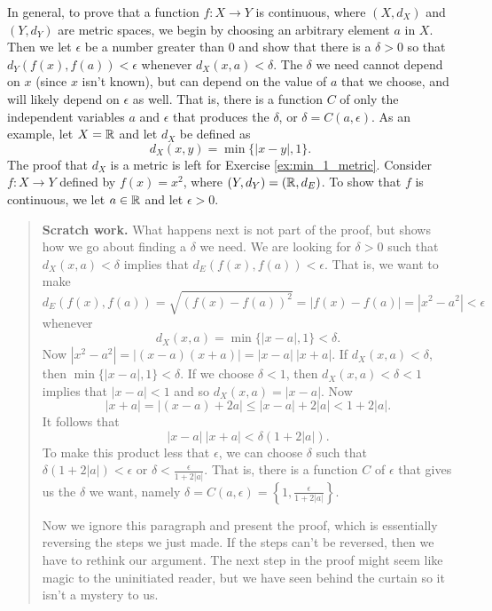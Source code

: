 \begin{example} In general, to prove that a function $f:X \to Y$ is continuous, where $(X,d_X)$ and $(Y, d_Y)$ are metric spaces, we begin by choosing an arbitrary element $a$ in $X$. Then we let $\epsilon$ be a number greater than $0$ and show that there is a $\delta > 0$ so that $d_Y(f(x),f(a)) < \epsilon$ whenever $d_X(x,a) < \delta$. The $\delta$ we need cannot depend on $x$ (since $x$ isn't known), but can depend on the value of $a$ that we choose, and will likely depend on $\epsilon$ as well. That is, there is a function $C$ of only the independent variables $a$ and $\epsilon$ that produces the $\delta$, or $\delta = C(a,\epsilon)$. As an example, let $X = \mathbb{R}$ and let $d_X$ be defined as 
\[d_X(x,y) = \min\{|x-y|,1\}.\]
The proof that $d_X$ is a metric is left for Exercise \ref{ex:min_1_metric}. Consider $f : X \to Y$ defined by $f(x) = x^2$, where $(Y,d_Y) = (\mathbb{R}, d_E)$. To show that $f$ is continuous, we let $a \in \mathbb{R}$ and let $\epsilon > 0$. 

\begin{quote} \textbf{Scratch work.} What happens next is not part of the proof, but shows how we go about finding a $\delta$ we need. We are looking for $\delta > 0$ such that $d_X(x,a) < \delta$ implies that $d_E(f(x),f(a)) < \epsilon$. That is, we want to make 
\[d_E(f(x),f(a)) = \sqrt{(f(x)-f(a))^2} = |f(x)-f(a)| = |x^2-a^2| < \epsilon\]
whenever
\[d_X(x,a) = \min\{|x-a|, 1\} < \delta.\]
Now $|x^2-a^2| = |(x-a)(x+a)| = |x-a| \ |x+a|$. If $d_X(x,a) < \delta$, then $\min\{|x-a|, 1\} < \delta$. If we choose $\delta < 1$, then $d_X(x,a) < \delta < 1$ implies that $|x-a| < 1$ and so $d_X(x,a) = |x-a|$. Now
\[|x+a| = |(x-a) + 2a| \leq |x-a| + 2|a| < 1+2|a|.\]
It follows that 
\[|x-a| \ |x+a| < \delta(1+2|a|).\]
To make this product less that $\epsilon$, we can choose $\delta$ such that $\delta(1+2|a|) < \epsilon$ or $\delta < \frac{\epsilon}{1+2|a|}$. That is, there is a function $C$ of $\epsilon$ that gives us the $\delta$ we want, namely $\delta = C(a,\epsilon) = \left\{1, \frac{\epsilon}{1+2|a|}\right\}$. 

Now we ignore this paragraph and present the proof, which is essentially reversing the steps we just made. If the steps can't be reversed, then we have to rethink our argument. The next step in the proof might seem like magic to the uninitiated reader, but we have seen behind the curtain so it isn't a mystery to us.
\end{quote}


\end{example}

